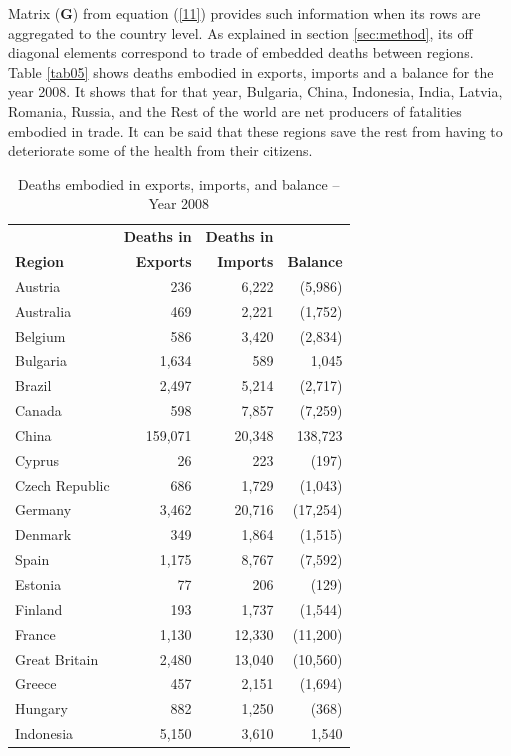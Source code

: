 \documentclass[a4paper,12pt]{article}
\begin{document}
Matrix ($\mathbf{G}$) from equation (\ref{11}) provides such information when its rows are aggregated to the country level. As explained in section \ref{sec:method}, its off diagonal elements correspond to trade of embedded deaths between regions. Table \ref{tab05} shows deaths embodied in exports, imports and a balance for the year 2008. It shows that for that year, Bulgaria, China, Indonesia, India, Latvia, Romania, Russia, and the Rest of the world are net producers of fatalities embodied in trade. It can be said that these regions save the rest from having to deteriorate some of the health from their citizens.

\begin{table} %
\caption{Deaths embodied in exports, imports, and balance -- Year 2008} 
\begin{center}
\small \begin{tabular}{lrrr}
 & \textbf{Deaths in} & \textbf{Deaths in} &  \\ 
\textbf{Region} & \textbf{Exports}& \textbf{Imports} & \textbf{Balance}\\ 
\hline
Austria &  236  &  6,222  & (5,986)\\ 
Australia &  469  &  2,221  & (1,752)\\ 
Belgium &  586  &  3,420  & (2,834)\\ 
Bulgaria &  1,634  &  589  & 1,045 \\ 
Brazil &  2,497  &  5,214  & (2,717)\\ 
Canada &  598  &  7,857  & (7,259)\\ 
China &  159,071  &  20,348  & 138,723 \\ 
Cyprus &  26  &  223  & (197)\\ 
Czech Republic &  686  &  1,729  & (1,043)\\ 
Germany &  3,462  &  20,716  & (17,254)\\ 
Denmark &  349  &  1,864  & (1,515)\\ 
Spain &  1,175  &  8,767  & (7,592)\\ 
Estonia &  77  &  206  & (129)\\ 
Finland &  193  &  1,737  & (1,544)\\ 
France &  1,130  &  12,330  & (11,200)\\ 
Great Britain &  2,480  &  13,040  & (10,560)\\ 
Greece &  457  &  2,151  & (1,694)\\ 
Hungary &  882  &  1,250  & (368)\\ 
Indonesia &  5,150  &  3,610  & 1,540 \\ 

\end{tabular}
\end{center}
\end{table}
\end{document}
